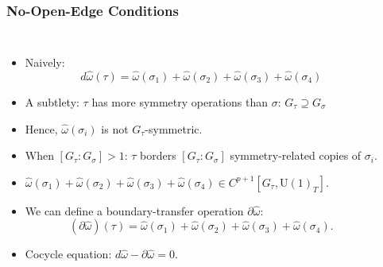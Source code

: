 \documentclass[xcolor=table, 10pt, aspectratio=43]{beamer}
\newcommand{\uone}{\mathrm U(1)}
\begin{document}
\begin{frame}
	\frametitle{No-Open-Edge Conditions}
	\begin{columns}
		\begin{itemize}
			\item Naively:
			\[d\hat\omega(\tau) = \hat\omega(\sigma_1)
			+\hat\omega(\sigma_2)+\hat\omega(\sigma_3)+\hat\omega(\sigma_4)\]
			\item A subtlety: $\tau$ has more symmetry operations than $\sigma$: $G_\tau \supseteq G_\sigma$
			\item Hence, $\hat\omega(\sigma_i)$ is not $G_\tau$-symmetric.
			\item When $[G_\tau:G_\sigma]>1$: $\tau$ borders $[G_\tau:G_\sigma]$ symmetry-related copies of $\sigma_i$.
			\item $\hat\omega(\sigma_1)
			+\hat\omega(\sigma_2)+\hat\omega(\sigma_3)+\hat\omega(\sigma_4)\in C^{p+1}[G_\tau,\uone_T]$.
			\item We can define a boundary-transfer operation $\partial\hat\omega$:
			\[(\partial\hat\omega)(\tau)=\hat\omega(\sigma_1)
			+\hat\omega(\sigma_2)+\hat\omega(\sigma_3)+\hat\omega(\sigma_4).\]
			\item Cocycle equation: $d\hat\omega - \partial\hat\omega=0.$
		\end{itemize}
	\end{columns}
\end{frame}
\end{document}
